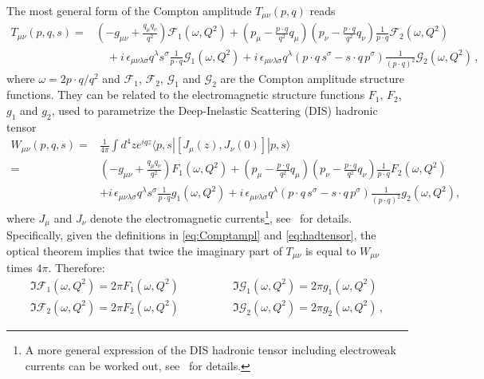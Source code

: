 The most general form of the Compton amplitude $T_{\mu\nu}(p,q)$ 
reads~\cite{Manohar:1992tz}
\begin{align}
T_{\mu\nu}(p,q,s) 
= {} & 
  \left(-g_{\mu\nu}+\frac{q_\mu q_\nu}{q^2}\right)\mathcal{F}_1(\omega,Q^2) 
+ \left(p_\mu-\frac{p\cdot q}{q^2}q_\mu\right) \left(p_\nu-\frac{p\cdot q}{q^2}q_\nu\right) \frac{1}{p\cdot q} \mathcal{F}_2(\omega,Q^2)
\nonumber\\ 
& {} \quad  
+ i\,\epsilon_{\mu\nu\lambda\sigma}q^\lambda s^\sigma \frac{1}{p\cdot q}\mathcal{G}_1(\omega,Q^2)
+ i\,\epsilon_{\mu\nu\lambda\sigma}q^\lambda \left(p\cdot q\, s^\sigma - s\cdot q\, p^\sigma\right) \frac{1}{(p\cdot q)^2}\mathcal{G}_2(\omega,Q^2)\,,
\label{eq:Comptampl}
\end{align}
where $\omega=2p\cdot q/q^2$ and $\mathcal{F}_1$, $\mathcal{F}_2$, 
$\mathcal{G}_1$ and $\mathcal{G}_2$ are the Compton amplitude structure 
functions.
%
They can be related to the electromagnetic structure functions
$F_1$, $F_2$, $g_1$ and $g_2$, used to parametrize the Deep-Inelastic 
Scattering (DIS) hadronic tensor
\begin{align}
W_{\mu\nu}(p,q,s)
= {} &
\frac{1}{4\pi}\int d^4z e^{iqz}\langle p,s |[J_\mu(z),J_\nu(0)]|p,s\rangle
\nonumber
\\
= {} &
\left(-g_{\mu\nu} +  \frac{q_\mu q_\nu}{q^2}\right) F_1(\omega,Q^2)
+\left( p_\mu - \frac{p\cdot q}{q^2}q_\mu \right)
 \left(p_\nu - \frac{p\cdot q}{q^2}q_\nu \right) \frac{1}{p\cdot q}
F_2(\omega, Q^2)
\nonumber
\\
& +i\,\epsilon_{\mu\nu\lambda\sigma}q^\lambda s^\sigma
\frac{1}{p\cdot q} g_1(\omega,Q^2)
+ i\,\epsilon_{\mu\nu\lambda\sigma}q^\lambda(p\cdot q\, s^\sigma - s\cdot q\, p^\sigma)
\frac{1}{(p\cdot q)^2}g_2(\omega,Q^2),
\label{eq:hadtensor}
\end{align}
where $J_\mu$ and $J_\nu$ denote the electromagnetic currents\footnote{A more
 general expression of the DIS hadronic tensor including electroweak currents
 can be worked out, see~\cite{Anselmino:1993tc,Anselmino:1992rn} for 
 details.}, see~\cite{Anselmino:1992rn,Manohar:1992tz} for details.
%
Specifically, given the definitions in \eqref{eq:Comptampl} and 
\eqref{eq:hadtensor}, the optical theorem implies that twice the imaginary 
part of $T_{\mu\nu}$ is equal to $W_{\mu\nu}$ times $4\pi$.
%
Therefore:
\begin{align}
\Im\mathcal{F}_1(\omega, Q^2) = 2\pi F_1(\omega,Q^2)
\qquad \qquad &
\Im\mathcal{G}_1(\omega, Q^2) = 2\pi g_1(\omega,Q^2)
\\
\Im\mathcal{F}_2(\omega, Q^2) = 2\pi F_2(\omega,Q^2)
\qquad \qquad &
\Im\mathcal{G}_2(\omega, Q^2) = 2\pi g_2(\omega,Q^2)\, ,
\end{align}

